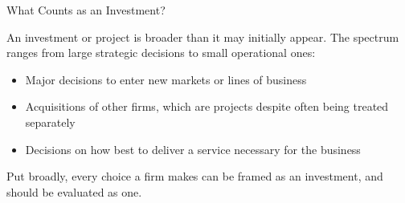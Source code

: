 \documentclass[10pt]{article}
\begin{document}
    \begin{core}{What Counts as an Investment?}

      An investment or project is broader than it may initially appear. The spectrum ranges from large strategic decisions to small operational ones:

      \begin{itemize}

        \item Major decisions to enter new markets or lines of business

        \item Acquisitions of other firms, which are projects despite often being treated separately

        \item Decisions on how best to deliver a service necessary for the business

      \end{itemize}

      Put broadly, every choice a firm makes can be framed as an investment, and should be evaluated as one.


    \end{core}
\end{document}
